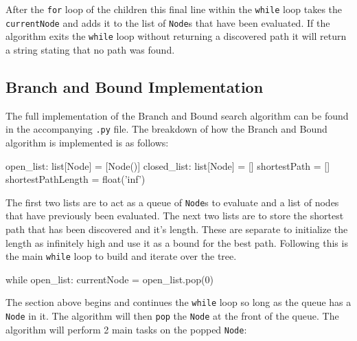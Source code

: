 \documentclass[12pt, letterpaper, final, onecolumn, titlepage] {article}
\begin{document}
\noindent After the \texttt{for} loop of the children this final line within the \texttt{while} loop takes the \texttt{currentNode} and adds it to the list of \texttt{Node}s that have been evaluated.
If the algorithm exits the \texttt{while} loop without returning a discovered path it will return a string stating that no path was found.
\newpage
\subsection{Branch and Bound Implementation}
The full implementation of the Branch and Bound search algorithm can be found in the accompanying \texttt{.py} file. The breakdown of how the Branch and Bound algorithm is implemented is as follows:

\begin{python}
open_list: list[Node] = [Node()]
closed_list: list[Node] = []
shortestPath = []
shortestPathLength = float('inf')
\end{python}

\noindent The first two lists are to act as a queue of \texttt{Node}s to evaluate and a list of nodes that have previously been evaluated. 
The next two lists are to store the shortest path that has been discovered and it's length.  These are separate to initialize the length as infinitely high and use it as a bound for the best path.
Following this is the main \texttt{while} loop to build and iterate over the tree.
\vspace{0.4cm}
\begin{python}
while open_list:
    currentNode = open_list.pop(0)
\end{python}

\noindent The section above begins and continues the \texttt{while} loop so long as the queue has a \texttt{Node} in it. The algorithm will then \texttt{pop} the \texttt{Node} at the front of the queue.
The algorithm will perform 2 main tasks on the popped \texttt{Node}:
\end{document}
